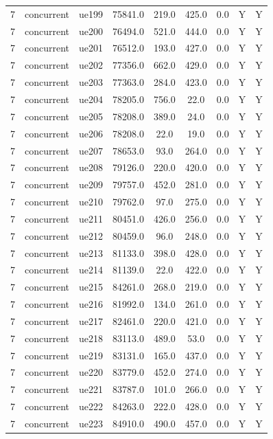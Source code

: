 \begin{table}[ht]
\begin{tabular}{|c|c|c|c|c|c|c|c|c|}
7 & concurrent & ue199 & 75841.0 & 219.0 & 425.0 & 0.0 & Y & Y \\
7 & concurrent & ue200 & 76494.0 & 521.0 & 444.0 & 0.0 & Y & Y \\
7 & concurrent & ue201 & 76512.0 & 193.0 & 427.0 & 0.0 & Y & Y \\
7 & concurrent & ue202 & 77356.0 & 662.0 & 429.0 & 0.0 & Y & Y \\
7 & concurrent & ue203 & 77363.0 & 284.0 & 423.0 & 0.0 & Y & Y \\
7 & concurrent & ue204 & 78205.0 & 756.0 & 22.0 & 0.0 & Y & Y \\
7 & concurrent & ue205 & 78208.0 & 389.0 & 24.0 & 0.0 & Y & Y \\
7 & concurrent & ue206 & 78208.0 & 22.0 & 19.0 & 0.0 & Y & Y \\
7 & concurrent & ue207 & 78653.0 & 93.0 & 264.0 & 0.0 & Y & Y \\
7 & concurrent & ue208 & 79126.0 & 220.0 & 420.0 & 0.0 & Y & Y \\
7 & concurrent & ue209 & 79757.0 & 452.0 & 281.0 & 0.0 & Y & Y \\
7 & concurrent & ue210 & 79762.0 & 97.0 & 275.0 & 0.0 & Y & Y \\
7 & concurrent & ue211 & 80451.0 & 426.0 & 256.0 & 0.0 & Y & Y \\
7 & concurrent & ue212 & 80459.0 & 96.0 & 248.0 & 0.0 & Y & Y \\
7 & concurrent & ue213 & 81133.0 & 398.0 & 428.0 & 0.0 & Y & Y \\
7 & concurrent & ue214 & 81139.0 & 22.0 & 422.0 & 0.0 & Y & Y \\
7 & concurrent & ue215 & 84261.0 & 268.0 & 219.0 & 0.0 & Y & Y \\
7 & concurrent & ue216 & 81992.0 & 134.0 & 261.0 & 0.0 & Y & Y \\
7 & concurrent & ue217 & 82461.0 & 220.0 & 421.0 & 0.0 & Y & Y \\
7 & concurrent & ue218 & 83113.0 & 489.0 & 53.0 & 0.0 & Y & Y \\
7 & concurrent & ue219 & 83131.0 & 165.0 & 437.0 & 0.0 & Y & Y \\
7 & concurrent & ue220 & 83779.0 & 452.0 & 274.0 & 0.0 & Y & Y \\
7 & concurrent & ue221 & 83787.0 & 101.0 & 266.0 & 0.0 & Y & Y \\
7 & concurrent & ue222 & 84263.0 & 222.0 & 428.0 & 0.0 & Y & Y \\
7 & concurrent & ue223 & 84910.0 & 490.0 & 457.0 & 0.0 & Y & Y \\

\end{tabular}
\end{table}
